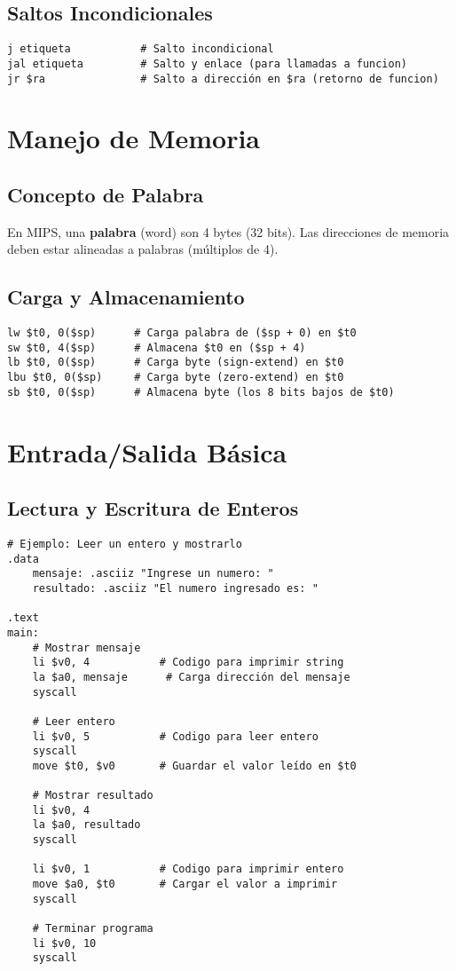 \documentclass{article}
\begin{document}
\subsection{Saltos Incondicionales}
\begin{lstlisting}[language={[mips]Assembler}]
j etiqueta           # Salto incondicional
jal etiqueta         # Salto y enlace (para llamadas a funcion)
jr $ra               # Salto a dirección en $ra (retorno de funcion)
\end{lstlisting}

\section{Manejo de Memoria}

\subsection{Concepto de Palabra}
En MIPS, una \textbf{palabra} (word) son 4 bytes (32 bits). Las direcciones de memoria deben estar alineadas a palabras (múltiplos de 4).

\subsection{Carga y Almacenamiento}
\begin{lstlisting}[language={[mips]Assembler}]
lw $t0, 0($sp)      # Carga palabra de ($sp + 0) en $t0
sw $t0, 4($sp)      # Almacena $t0 en ($sp + 4)
lb $t0, 0($sp)      # Carga byte (sign-extend) en $t0
lbu $t0, 0($sp)     # Carga byte (zero-extend) en $t0
sb $t0, 0($sp)      # Almacena byte (los 8 bits bajos de $t0)
\end{lstlisting}

\section{Entrada/Salida Básica}

\subsection{Lectura y Escritura de Enteros}
\begin{lstlisting}[language={[mips]Assembler}]
# Ejemplo: Leer un entero y mostrarlo
.data
    mensaje: .asciiz "Ingrese un numero: "
    resultado: .asciiz "El numero ingresado es: "

.text
main:
    # Mostrar mensaje
    li $v0, 4           # Codigo para imprimir string
    la $a0, mensaje      # Carga dirección del mensaje
    syscall

    # Leer entero
    li $v0, 5           # Codigo para leer entero
    syscall
    move $t0, $v0       # Guardar el valor leído en $t0

    # Mostrar resultado
    li $v0, 4
    la $a0, resultado
    syscall

    li $v0, 1           # Codigo para imprimir entero
    move $a0, $t0       # Cargar el valor a imprimir
    syscall

    # Terminar programa
    li $v0, 10
    syscall
\end{lstlisting}
\end{document}
